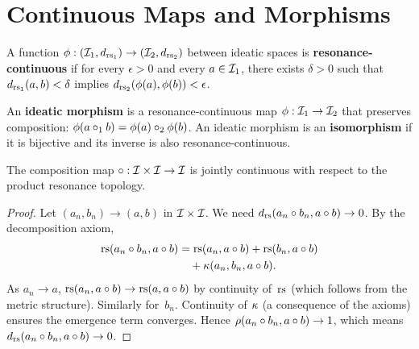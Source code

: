 \section{Continuous Maps and Morphisms}
\label{sec:continuous-maps}

\begin{definition}
\label{def:continuous-map}
A function $\phi : (\mathcal{I}_1, d_{\mathrm{rs}_1}) \to (\mathcal{I}_2, d_{\mathrm{rs}_2})$
between ideatic spaces is \textbf{resonance-continuous} if for
every $\epsilon > 0$ and every $a \in \mathcal{I}_1$, there exists
$\delta > 0$ such that $d_{\mathrm{rs}_1}(a,b) < \delta$ implies
$d_{\mathrm{rs}_2}(\phi(a),\phi(b)) < \epsilon$.
\end{definition}

\begin{definition}
\label{def:morphism}
An \textbf{ideatic morphism} is a resonance-continuous map
$\phi : \mathcal{I}_1 \to \mathcal{I}_2$ that preserves composition:
$\phi(a \circ_1 b) = \phi(a) \circ_2 \phi(b)$.
An ideatic morphism is an \textbf{isomorphism} if it is bijective
and its inverse is also resonance-continuous.
\end{definition}

\begin{theorem}
\label{thm:composition-continuous}
The composition map $\circ : \mathcal{I} \times \mathcal{I} \to \mathcal{I}$ is
jointly continuous with respect to the product resonance topology.
\end{theorem}

\begin{proof}
Let $(a_n, b_n) \to (a,b)$ in $\mathcal{I} \times \mathcal{I}$.  We need
$d_{\mathrm{rs}}(a_n \circ b_n, a \circ b) \to 0$.  By the
decomposition axiom,
\begin{align*}
  \mathrm{rs}(a_n \circ b_n, a \circ b)
  &= \mathrm{rs}(a_n, a\circ b) + \mathrm{rs}(b_n, a\circ b) \\
  &\quad + \kappa(a_n, b_n, a\circ b).
\end{align*}
As $a_n \to a$, $\mathrm{rs}(a_n, a\circ b) \to \mathrm{rs}(a, a\circ b)$
by continuity of~$\mathrm{rs}$ (which follows from the metric structure).
Similarly for~$b_n$.  Continuity of $\kappa$ (a consequence of
the axioms) ensures the emergence term converges.  Hence
$\rho(a_n\circ b_n, a\circ b) \to 1$, which means
$d_{\mathrm{rs}}(a_n\circ b_n, a\circ b) \to 0$.
\end{proof}

